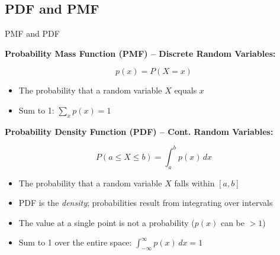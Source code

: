 \documentclass{beamer}
\begin{document}
\subsection{PDF and PMF}

\begin{frame}{PMF and PDF}

\textbf{Probability Mass Function (PMF) -- Discrete Random Variables:}

\[
  \boxed{p(x)} = P(X = x)
\]

\begin{itemize}
  \item The probability that a random variable $X$ equals $x$
  \item Sum to 1: \(\sum_{x} p(x) = 1\)
\end{itemize}

\vspace{1em}

\textbf{Probability Density Function (PDF) -- Cont. Random Variables:}

\[
P(a \leq X \leq b) = \int_a^b \boxed{p(x)} \, dx
\]

\begin{itemize}
  \item The probability that a random variable $X$ falls within $[a, b]$
  \item PDF is the \textit{density}; probabilities result from integrating over intervals
  \item The value at a single point is not a probability ($p(x)$ can be $>1$)
  \item Sum to 1 over the entire space: \(\int_{-\infty}^{\infty} p(x) \, dx = 1\)
\end{itemize}

\end{frame}
\end{document}

